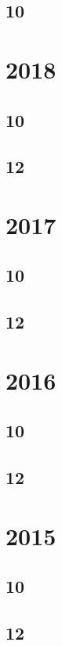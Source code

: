 \documentclass[11pt]{book}
\begin{document}
\subsection{10}

\section{2018} 
\subsection{10}


\subsection{12}




\section{2017}
\subsection{10}

\subsection{12}




\section{2016}
\subsection{10}

\subsection{12}


\section{2015}
\subsection{10}


\subsection{12}

\end{document}
